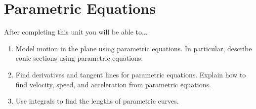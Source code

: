 \documentclass[10pt,]{book}
\theoremstyle{plain}
\theoremstyle{definition}
\theoremstyle{definition}
\theoremstyle{definition}
\theoremstyle{definition}
\theoremstyle{definition}
\numberwithin{equation}{section}
\begin{document}
\chapter[{Parametric Equations}]{Parametric Equations}\label{chapter-4}
After completing this unit you will be able to... \leavevmode%
\begin{enumerate}
\item\hypertarget{li-36}{}Model motion in the plane using parametric equations. In particular, describe conic sections using parametric equations.%
\item\hypertarget{li-37}{}Find derivatives and tangent lines for parametric equations. Explain how to find velocity, speed, and acceleration from parametric equations.%
\item\hypertarget{li-38}{}Use integrals to find the lengths of parametric curves.%
\end{enumerate}
%
\typeout{************************************************}
\typeout{************************************************}
\end{document}
